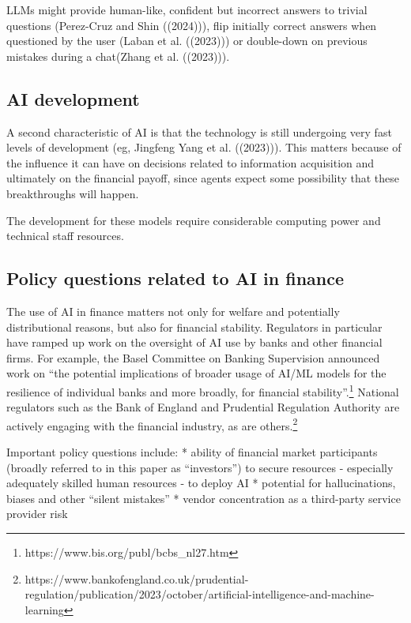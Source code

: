 \documentclass[
]{article}
\theoremstyle{plain}
\theoremstyle{definition}
\theoremstyle{remark}
\begin{document}
LLMs might provide human-like, confident but incorrect answers to
trivial questions (Perez-Cruz and Shin ((2024))), flip initially correct
answers when questioned by the user (Laban et al. ((2023))) or
double-down on previous mistakes during a chat(Zhang et al. ((2023))).

\hypertarget{ai-development}{%
\subsection{AI development}\label{ai-development}}

A second characteristic of AI is that the technology is still undergoing
very fast levels of development (eg, Jingfeng Yang et al. ((2023))).
This matters because of the influence it can have on decisions related
to information acquisition and ultimately on the financial payoff, since
agents expect some possibility that these breakthroughs will happen.

The development for these models require considerable computing power
and technical staff resources.

\hypertarget{policy-questions-related-to-ai-in-finance}{%
\subsection{Policy questions related to AI in
finance}\label{policy-questions-related-to-ai-in-finance}}

The use of AI in finance matters not only for welfare and potentially
distributional reasons, but also for financial stability. Regulators in
particular have ramped up work on the oversight of AI use by banks and
other financial firms. For example, the Basel Committee on Banking
Supervision announced work on ``the potential implications of broader
usage of AI/ML models for the resilience of individual banks and more
broadly, for financial stability''.\footnote{https://www.bis.org/publ/bcbs\_nl27.htm}
National regulators such as the Bank of England and Prudential
Regulation Authority are actively engaging with the financial industry,
as are others.\footnote{https://www.bankofengland.co.uk/prudential-regulation/publication/2023/october/artificial-intelligence-and-machine-learning}

Important policy questions include: * ability of financial market
participants (broadly referred to in this paper as ``investors'') to
secure resources - especially adequately skilled human resources - to
deploy AI * potential for hallucinations, biases and other ``silent
mistakes'' * vendor concentration as a third-party service provider risk
\end{document}
